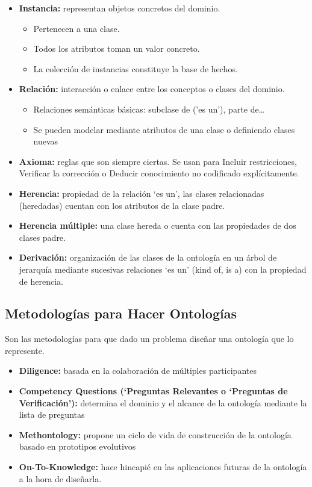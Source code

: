 \documentclass[12pt, twoside, openright]{report} %
\begin{document}
\begin{itemize}
	\item \textbf{Instancia:} representan objetos concretos del dominio.
	      \begin{itemize}
		      \item Pertenecen a una clase.
		      \item Todos los atributos toman un valor concreto.
		      \item La colección de instancias constituye la base de hechos.
	      \end{itemize}
	\item \textbf{Relación:} interacción o enlace entre los conceptos o clases del dominio.
	      \begin{itemize}
		      \item Relaciones semánticas básicas: subclase de (’es un’), parte de…
		      \item Se pueden modelar mediante atributos de una clase o definiendo clases nuevas
	      \end{itemize}
	\item \textbf{Axioma:} reglas que son siempre ciertas. Se usan para Incluir restricciones, Verificar la corrección o Deducir conocimiento no codificado explícitamente.
	\item \textbf{Herencia:} propiedad de la relación ‘es un’, las clases relacionadas (heredadas) cuentan con los atributos de la clase padre.
	\item \textbf{Herencia múltiple:} una clase hereda o cuenta con las propiedades de dos clases padre.
	\item \textbf{Derivación:} organización de las clases de la ontología en un árbol de jerarquía mediante sucesivas relaciones ‘es un’ (kind of, is a) con la propiedad de herencia.
\end{itemize}

\subsection{Metodologías para Hacer Ontologías}
Son las metodologías para que dado un problema diseñar una ontología que lo represente.
\begin{itemize}
	\item \textbf{Diligence:} basada en la colaboración de múltiples participantes
	\item \textbf{Competency Questions (‘Preguntas Relevantes o ‘Preguntas de Verificación’):} determina el dominio y el alcance de la ontología mediante la lista de preguntas
	\item \textbf{Methontology:} propone un ciclo de vida de construcción de la ontología basado en prototipos evolutivos
	\item \textbf{On-To-Knowledge:} hace hincapié en las aplicaciones futuras de la ontología a la hora de diseñarla.
\end{itemize}
\pagebreak
\end{document}
